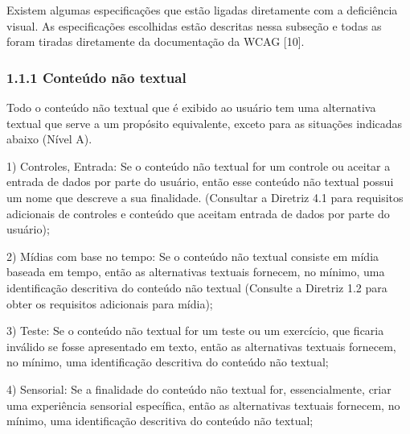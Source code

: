 \documentclass[a4paper]{article}
\begin{document}
\begin{titlepage}
Existem algumas especificações que estão ligadas diretamente com a deficiência visual. As especificações escolhidas estão descritas nessa subseção e todas as foram tiradas diretamente da documentação da WCAG [10].

\subsubsection{1.1.1 Conteúdo não textual}

Todo o conteúdo não textual que é exibido ao usuário tem uma alternativa textual que serve a um propósito equivalente, exceto para as situações indicadas abaixo (Nível A).\\

\hspace{.1\textwidth} %
\begin{minipage}{.85\textwidth}
	1) Controles, Entrada: Se o conteúdo não textual for um controle ou aceitar a entrada de dados por parte do usuário, então esse conteúdo não textual possui um nome que descreve a sua finalidade. (Consultar a Diretriz 4.1 para requisitos adicionais de controles e conteúdo que aceitam entrada de dados por parte do usuário);\\
\end{minipage}

\hspace{.1\textwidth} %
\begin{minipage}{.85\textwidth}
	2) Mídias com base no tempo: Se o conteúdo não textual consiste em mídia baseada em tempo, então as alternativas textuais fornecem, no mínimo, uma identificação descritiva do conteúdo não textual (Consulte a Diretriz 1.2 para obter os requisitos adicionais para mídia);\\
\end{minipage}

\hspace{.1\textwidth} %
\begin{minipage}{.85\textwidth}
	3) Teste: Se o conteúdo não textual for um teste ou um exercício, que ficaria inválido se fosse apresentado em texto, então as alternativas textuais fornecem, no mínimo, uma identificação descritiva do conteúdo não textual;\\
\end{minipage}

\hspace{.1\textwidth} %
\begin{minipage}{.85\textwidth}
	4) Sensorial: Se a finalidade do conteúdo não textual for, essencialmente, criar uma experiência sensorial específica, então as alternativas textuais fornecem, no mínimo, uma identificação descritiva do conteúdo não textual;\\
\end{minipage}


\end{titlepage}
\end{document}
